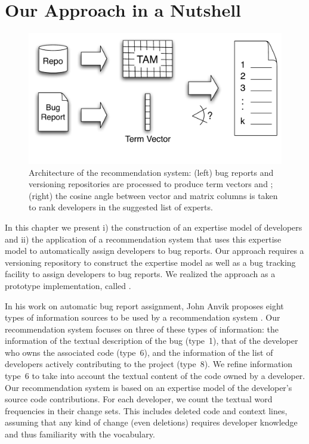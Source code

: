 \section{Our Approach in a Nutshell}\label{sec:nutshell}

\begin{figure}
    \includegraphics[width=\linewidth]{fig/devlect-pipeline}
    \caption{Architecture of the \DEVLECT recommendation system: (left) bug reports and versioning repositories are processed to produce term vectors and \TAMS; (right) the cosine angle between vector and matrix columns is taken to rank developers in the suggested list of experts.}
    \label{fig:algo}
\end{figure} 

In this chapter we present i) the construction of an expertise model of developers and ii) the application of a recommendation system that uses this expertise model to automatically assign developers to bug reports. Our approach requires a versioning repository to construct the expertise model as well as a bug tracking facility to assign developers to bug reports. We realized the approach as a prototype implementation, called \DEVLECT.

In his work on automatic bug report assignment, John Anvik proposes eight types of information sources to be used by a recommendation system \cite{Anvi06b}. Our recommendation system focuses on three of these types of information: the information of the textual description of the bug (type~1), that of the developer who owns the associated code (type~6), and the information of the list of developers actively contributing to the project (type~8). We refine information type~6 to take into account the textual content of the code owned by a developer. Our recommendation system is based on an expertise model of the developer's source code contributions. For each developer, we count the textual word frequencies in their change sets. This includes deleted code and context lines, assuming that any kind of change (even deletions) requires developer knowledge and thus familiarity with the vocabulary. 

